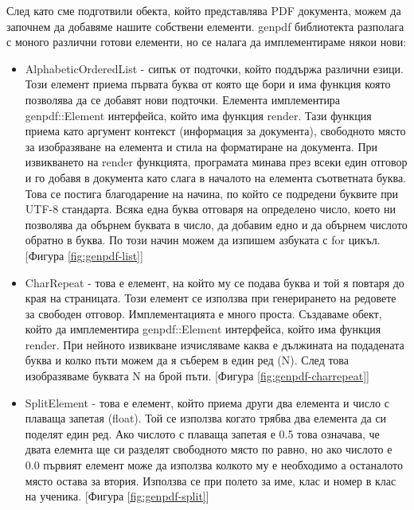 След като сме подготвили обекта, който представлява PDF документа, можем да
започнем да добавяме нашите собствени елементи. genpdf библиотекта разполага
с моного различни готови елементи, но се налага да имплементираме някои нови:
\begin{itemize}
    \item AlphabeticOrderedList - сипък от подточки, който поддържа различни езици.
        Този елемент приема първата буква от която ще бори и има функция която позволява
        да се добавят нови подточки. Елемента имплементира genpdf::Element интерфейса,
        който има функция render. Тази функция приема като аргумент контекст
        (информация за документа), свободното място за изобразяване на елемента
        и стила на форматиране на документа. При извикването на render
        функцията, програмата минава през всеки един отговор и го добавя в
        документа като слага в началото на елемента съответната буква.
        Това се постига благодарение на начина, по който се подредени буквите при UTF-8
        стандарта. Всяка една буква отговаря на определено число, което ни позволява да
        обърнем буквата в число, да добавим едно и да обърнем числото обратно в буква.
        По този начин можем да изпишем азбуката с for цикъл.
        [Фигура \ref{fig:genpdf-list}]

    \item CharRepeat - това е елемент, на който му се подава буква и той я
        повтаря до края на страницата. Този елемент се използва при
        генерирането на редовете за свободен отговор. Имплементацията е много
        проста. Създаваме обект, който да имплементира genpdf::Element
        интерфейса, който има функция render. При нейното извикване изчисляваме
        каква е дължината на подадената буква и колко пъти можем да я съберем в един
        ред (N). След това изобразяваме буквата N на брой пъти.
        [Фигура \ref{fig:genpdf-charrepeat}]

    \item SplitElement - това е елемент, който приема други два елемента и
        число с плаваща запетая (float). Той се използва когато трябва два
        елемента да си поделят един ред. Ако числото с плаваща запетая е 0.5
        това означава, че двата елемнта ще си разделят свободното място по
        равно, но ако числото е 0.0 първият елемент може да използва колкото му
        е необходимо а останалото място остава за втория. Използва се при
        полето за име, клас и номер в клас на ученика.
        [Фигура \ref{fig:genpdf-split}]
\end{itemize}


